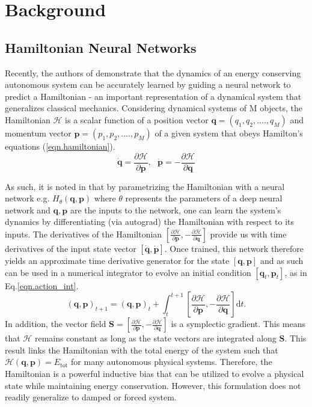 \documentclass[twoside]{article}
\begin{document}
\section{Background}

\subsection{Hamiltonian Neural Networks}

Recently, the authors of \cite{greydanus_hamiltonian_2019} demonstrate that the dynamics of an energy conserving autonomous system can be accurately learned by guiding a neural network to predict a Hamiltonian - an important representation of a dynamical system that generalizes classical mechanics. Considering dynamical systems of M objects, the Hamiltonian $\mathcal{H}$ is a scalar function of a position vector $\mathbf{q} = (q_1,q_2,....,q_M)$ and momentum vector $\mathbf{p} = (p_1,p_2,....,p_M)$ of a given system that obeys Hamilton's equations (\ref{eqn.hamiltonian}).
\begin{equation}
\dot{\mathbf{q}}= \frac{\partial \mathcal{H}}{\partial \mathbf{p}}, ~~~
\dot{\mathbf{p}}= -\frac{\partial \mathcal{H}}{\partial \mathbf{q}}
\label{eqn.hamiltonian}
\end{equation}

As such, it is noted in \cite{greydanus_hamiltonian_2019} that by parametrizing the Hamiltonian with a neural network e.g. $H_{\theta}(\mathbf{q},\mathbf{p})$ where $\theta$ represents the parameters of a deep neural network and $\mathbf{q},\mathbf{p}$ are the inputs to the network, one can learn the system's dynamics by differentiating (via autograd) the Hamiltonian with respect to its inputs. The derivatives of the Hamiltonian $\left [ \frac{\partial \mathcal{H}}{\partial \mathbf{p}},-\frac{\partial \mathcal{H}}{\partial \mathbf{q}} \right ]$ provide us with time derivatives of the input state vector $[\dot{\mathbf{q}},\dot{\mathbf{p}}]$. Once trained, this network therefore yields an approximate time derivative generator for the state $[\mathbf{q},\mathbf{p}]$ and as such can be used in a numerical integrator to evolve an initial condition $[\mathbf{q}_t,\mathbf{p}_t]$, as in Eq.\ref{eqn.action_int}.
\begin{equation}
(\mathbf{q},\mathbf{p})_{t+1} = (\mathbf{q},\mathbf{p})_t + \int_t^{t+1} \left [ \frac{\partial \mathcal{H}}{\partial \mathbf{p}},-\frac{\partial \mathcal{H}}{\partial \mathbf{q}} \right ] \mathrm{d}t.
\label{eqn.action_int}
\end{equation}
In addition, the vector field $\mathbf{S} = \left [ \frac{\partial \mathcal{H}}{\partial \mathbf{p}},-\frac{\partial \mathcal{H}}{\partial \mathbf{q}} \right ]$ is a symplectic gradient. This means that $\mathcal{H}$ remains constant as long as the state vectors are integrated along $\mathbf{S}$. This result links the Hamiltonian with the total energy of the system such that $\mathcal{H}(\mathbf{q},\mathbf{p}) = E_{\mathrm{tot}}$ for many autonomous physical systems. Therefore, the Hamiltonian is a powerful inductive bias that can be utilized to evolve a physical state while maintaining energy conservation. However, this formulation does not readily generalize to damped or forced system.
\end{document}
